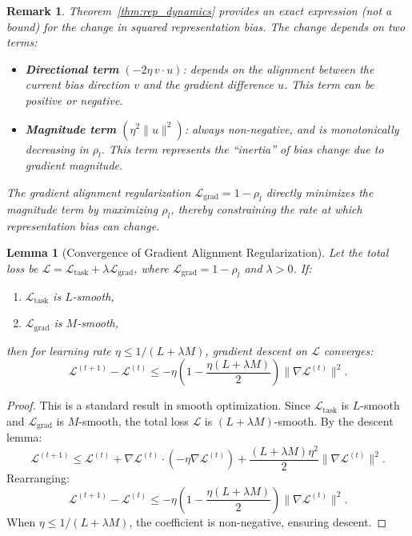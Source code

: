 \documentclass[11pt]{article}
\newtheorem{lemma}[theorem]{Lemma}
\newtheorem{remark}[theorem]{Remark}
\begin{document}
\begin{remark}
    Theorem~\ref{thm:rep_dynamics} provides an \emph{exact} expression (not a bound) for the change in squared representation bias. The change depends on two terms:
    \begin{itemize}
        \item \textbf{Directional term} $(-2\eta\, v \cdot u)$: depends on the alignment between the current bias direction $v$ and the gradient difference $u$. This term can be positive or negative.
        \item \textbf{Magnitude term} $(\eta^2 \|u\|^2)$: always non-negative, and is monotonically decreasing in $\rho_l$. This term represents the ``inertia'' of bias change due to gradient magnitude.
    \end{itemize}
    The gradient alignment regularization $\mathcal{L}_{\mathrm{grad}} = 1 - \rho_l$ directly minimizes the magnitude term by maximizing $\rho_l$, thereby constraining the rate at which representation bias can change.
\end{remark}

\begin{lemma}[Convergence of Gradient Alignment Regularization]
    \label{lem:convergence}
    Let the total loss be $\mathcal{L} = \mathcal{L}_{\text{task}} + \lambda \mathcal{L}_{\mathrm{grad}}$, where $\mathcal{L}_{\mathrm{grad}} = 1 - \rho_l$ and $\lambda > 0$. If:
    \begin{enumerate}
        \item $\mathcal{L}_{\text{task}}$ is $L$-smooth,
        \item $\mathcal{L}_{\mathrm{grad}}$ is $M$-smooth,
        \end{enumerate}
    then for learning rate $\eta \leq 1/(L + \lambda M)$, gradient descent on $\mathcal{L}$ converges:
    \begin{equation}
        \mathcal{L}^{(t+1)} - \mathcal{L}^{(t)} \leq -\eta\!\left(1 - \frac{\eta(L+\lambda M)}{2}\right) \|\nabla \mathcal{L}^{(t)}\|^2.
    \end{equation}
\end{lemma}

\begin{proof}
    This is a standard result in smooth optimization. Since $\mathcal{L}_{\text{task}}$ is $L$-smooth and $\mathcal{L}_{\mathrm{grad}}$ is $M$-smooth, the total loss $\mathcal{L}$ is $(L + \lambda M)$-smooth. By the descent lemma:
    \begin{equation}
        \mathcal{L}^{(t+1)} \leq \mathcal{L}^{(t)} + \nabla \mathcal{L}^{(t)} \cdot (-\eta \nabla \mathcal{L}^{(t)}) + \frac{(L+\lambda M)\eta^2}{2} \|\nabla \mathcal{L}^{(t)}\|^2.
    \end{equation}
    Rearranging:
    \begin{equation}
        \mathcal{L}^{(t+1)} - \mathcal{L}^{(t)} \leq -\eta\!\left(1 - \frac{\eta(L+\lambda M)}{2}\right) \|\nabla \mathcal{L}^{(t)}\|^2.
    \end{equation}
    When $\eta \leq 1/(L+\lambda M)$, the coefficient is non-negative, ensuring descent.
\end{proof}
\end{document}
